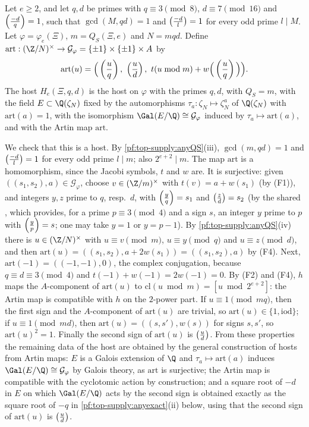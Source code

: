 \begin{definition}\label{pf:top-supply:anyhost}
Let $e\ge2$, and let $q,d$ be primes with $q\equiv3\pmod8$, $d\equiv7\pmod{16}$ and $\left(\frac{-d}{q}\right)=1$, such that
$\gcd(M,qd)=1$ and $\left(\frac{-d}{l}\right)=1$ for every odd prime $l\mid M$. Let $\varphi=\varphi_e(\Xi)$, $m=Q_S(\Xi,e)$ and
$N=mqd$. Define $\mathrm{art}:(\Z/N)^\times\to\mathcal G_\varphi=\{\pm1\}\times\{\pm1\}\times A$ by
\begin{equation}\label{eq:pf:top-supply:anyart}
\mathrm{art}(u)=\Big(\left(\frac{u}{q}\right),\ \left(\frac{u}{d}\right),\ t(u\bmod m)+w\Big(\left(\frac{u}{q}\right)\Big)\Big).
\end{equation}
The host $H_e(\Xi,q,d)$ is the host on $\varphi$ with the primes $q,d$, with $Q_S=m$, with the field
$E\subset\Q(\zeta_N)$ fixed by the automorphisms $\tau_a:\zeta_N\mapsto\zeta_N^a$ of $\Q(\zeta_N)$ with $\mathrm{art}(a)=1$,
with the isomorphism $\Gal(E/\Q)\cong\mathcal G_\varphi$ induced by $\tau_a\mapsto\mathrm{art}(a)$, and with the Artin map
$\mathrm{art}$.
 
\end{definition}

We check that this is a host. By \cref{pf:top-supply:anyQS}(iii), $\gcd(m,qd)=1$ and $\left(\frac{-d}{l}\right)=1$ for every odd
prime $l\mid m$; also $2^{e+2}\mid m$. The map $\mathrm{art}$ is a homomorphism, since the Jacobi symbols, $t$ and $w$ are.
It is surjective: given $((s_1,s_2),a)\in\mathcal G_\varphi$, choose $v\in(\Z/m)^\times$ with $t(v)=a+w(s_1)$ (by (F1)),
and integers $y,z$ prime to $q$, resp.\ $d$, with $\left(\frac{y}{q}\right)=s_1$ and $\left(\frac{z}{d}\right)=s_2$ (by the shared
, which provides, for a prime $p\equiv3\pmod4$ and a sign $s$, an integer $y$ prime to
$p$ with $\left(\frac{y}{p}\right)=s$; one may take $y=1$ or $y=p-1$). By \cref{pf:top-supply:anyQS}(iv) there is
$u\in(\Z/N)^\times$ with $u\equiv v\pmod m$, $u\equiv y\pmod q$ and $u\equiv z\pmod d$, and then
$\mathrm{art}(u)=((s_1,s_2),a+2w(s_1))=((s_1,s_2),a)$ by (F4). Next, $\mathrm{art}(-1)=((-1,-1),0)$, the complex conjugation,
because $q\equiv d\equiv3\pmod4$ and $t(-1)+w(-1)=2w(-1)=0$. By (F2) and (F4), $h$ maps the $A$-component of
$\mathrm{art}(u)$ to $\mathrm{cl}(u\bmod m)=[u\bmod2^{e+2}]$: the Artin map is compatible with $h$ on the $2$-power part.
If $u\equiv1\pmod{mq}$, then the first sign and the $A$-component of $\mathrm{art}(u)$ are trivial, so
$\mathrm{art}(u)\in\{1,\mathrm{iod}\}$; if $u\equiv1\pmod{md}$, then $\mathrm{art}(u)=((s,s'),w(s))$ for signs $s,s'$, so
$\mathrm{art}(u)^2=1$. Finally the second sign of $\mathrm{art}(u)$ is $\left(\frac{u}{d}\right)$. From these properties the remaining
data of the host are obtained by the general construction of hosts from Artin maps: $E$ is a Galois extension of $\Q$ and
$\tau_a\mapsto\mathrm{art}(a)$ induces $\Gal(E/\Q)\cong\mathcal G_\varphi$ by Galois theory, as $\mathrm{art}$ is surjective;
the Artin map is compatible with the cyclotomic action by construction; and a square root of $-d$ in $E$ on which
$\Gal(E/\Q)$ acts by the second sign is obtained exactly as the square root of $-q$ in
\cref{pf:top-supply:anyexact}(ii) below, using that the second sign of $\mathrm{art}(u)$ is $\left(\frac{u}{d}\right)$.

